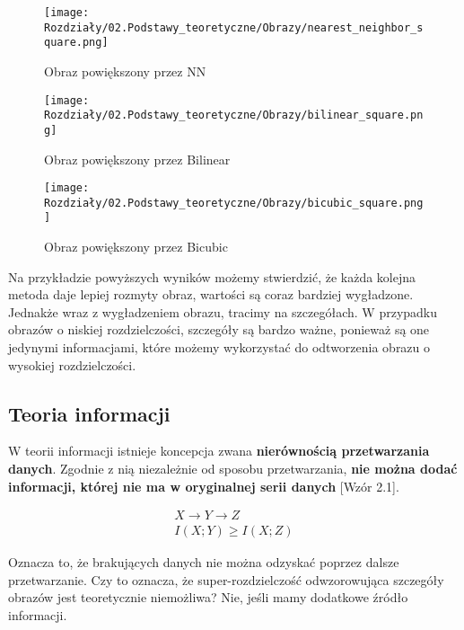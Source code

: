 \begin{figure}[H]
    \centering
    \begin{minipage}[t]{0.28\linewidth}
        \texttt{[image: Rozdziały/02.Podstawy\_teoretyczne/Obrazy/nearest\_neighbor\_square.png]}
        \caption{Obraz powiększony przez NN}
        \label{fig:image7000}
    \end{minipage}
    \hspace{0.5cm}
    \begin{minipage}[t]{0.28\linewidth}
        \texttt{[image: Rozdziały/02.Podstawy\_teoretyczne/Obrazy/bilinear\_square.png]}
        \caption{Obraz powiększony przez Bilinear}
        \label{fig:image8000}
    \end{minipage}
    \hspace{0.5cm}
    \begin{minipage}[t]{0.28\linewidth}
        \texttt{[image: Rozdziały/02.Podstawy\_teoretyczne/Obrazy/bicubic\_square.png]}
        \caption{Obraz powiększony przez Bicubic}
        \label{fig:image9000}
    \end{minipage}
\end{figure}

Na przykładzie powyższych wyników możemy stwierdzić, że każda kolejna metoda daje lepiej rozmyty obraz, wartości są coraz bardziej wygładzone. Jednakże wraz z wygładzeniem obrazu, tracimy na szczegółach. W przypadku obrazów o niskiej rozdzielczości, szczegóły są bardzo ważne, ponieważ są one jedynymi informacjami, które możemy wykorzystać do odtworzenia obrazu o wysokiej rozdzielczości.

\subsection*{Teoria informacji}

W teorii informacji istnieje koncepcja zwana \textbf{nierównością przetwarzania danych}. Zgodnie z nią niezależnie od sposobu przetwarzania, \textbf{nie można dodać informacji, której nie ma w oryginalnej serii danych}  [Wzór 2.1].

\begin{equation}
    \begin{gathered}
    X \rightarrow Y \rightarrow Z \\
    I(X ; Y) \geq I(X ; Z)
    \end{gathered}
\end{equation}

Oznacza to, że brakujących danych nie można odzyskać poprzez dalsze przetwarzanie. Czy to oznacza, że super-rozdzielczość odwzorowująca szczegóły obrazów jest teoretycznie niemożliwa? 
Nie, jeśli mamy dodatkowe źródło informacji. 


